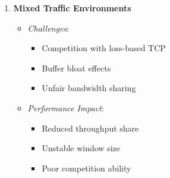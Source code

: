 \documentclass[11pt,a4paper]{article}
\begin{document}
\begin{tcolorbox}[
    enhanced,
    colback=white,
    colframe=green!75!black,
    title=Limitation Scenarios]
\begin{enumerate}
    \item \textbf{Mixed Traffic Environments}
    \begin{itemize}
        \item \textit{Challenges}:
        \begin{itemize}
            \item Competition with loss-based TCP
            \item Buffer bloat effects
            \item Unfair bandwidth sharing
        \end{itemize}
        \item \textit{Performance Impact}:
        \begin{itemize}
            \item Reduced throughput share
            \item Unstable window size
            \item Poor competition ability
        \end{itemize}
    \end{itemize}
\end{enumerate}
\end{tcolorbox}

\end{document}
